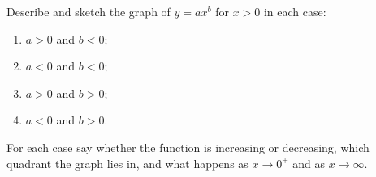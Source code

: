 Describe and sketch the graph of $y=ax^{b}$ for $x>0$ in each case:
\begin{enumerate}
\item[(a)] $a>0$ and $b<0$;
\item[(b)] $a<0$ and $b<0$;
\item[(c)] $a>0$ and $b>0$;
\item[(d)] $a<0$ and $b>0$.
\end{enumerate}
For each case say whether the function is increasing or decreasing, which quadrant the graph lies in, and what happens as $x\to0^{+}$ and as $x\to\infty$.
